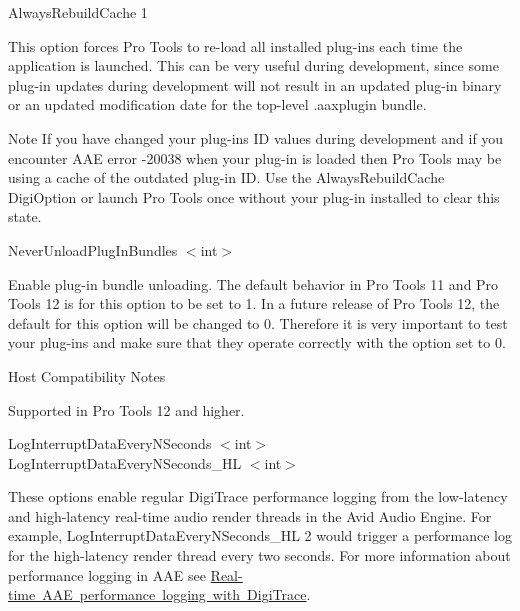 \begin{DoxyItemize}
\item  {\ttfamily Always\+Rebuild\+Cache 1}

This option forces Pro Tools to re-\/load all installed plug-\/ins each time the application is launched. This can be very useful during development, since some plug-\/in updates during development will not result in an updated plug-\/in binary or an updated modification date for the top-\/level .aaxplugin bundle.

\begin{DoxyNote}{Note}
If you have changed your plug-\/in\textquotesingle{}s ID values during development and if you encounter A\+AE error -\/20038 when your plug-\/in is loaded then Pro Tools may be using a cache of the outdated plug-\/in ID. Use the Always\+Rebuild\+Cache Digi\+Option or launch Pro Tools once without your plug-\/in installed to clear this state.
\end{DoxyNote}

\item  {\ttfamily Never\+Unload\+Plug\+In\+Bundles $<$int$>$}

Enable plug-\/in bundle unloading. The default behavior in Pro Tools 11 and Pro Tools 12 is for this option to be set to 1. In a future release of Pro Tools 12, the default for this option will be changed to 0. Therefore it is very important to test your plug-\/ins and make sure that they operate correctly with the option set to 0.

\begin{DoxyRefDesc}{Host Compatibility Notes}
\item[\mbox{\hyperlink{a00786__compatibility_notes000016}{Host Compatibility Notes}}]Supported in Pro Tools 12 and higher.\end{DoxyRefDesc}





\item  {\ttfamily Log\+Interrupt\+Data\+Every\+N\+Seconds $<$int$>$ }~\newline
 {\ttfamily Log\+Interrupt\+Data\+Every\+N\+Seconds\+\_\+\+HL $<$int$>$}

These options enable regular Digi\+Trace performance logging from the low-\/latency and high-\/latency real-\/time audio render threads in the Avid Audio Engine. For example, {\ttfamily Log\+Interrupt\+Data\+Every\+N\+Seconds\+\_\+\+HL 2} would trigger a performance log for the high-\/latency render thread every two seconds. For more information about performance logging in A\+AE see \mbox{\hyperlink{a00834_digitrace__performancelogging}{Real-\/time A\+AE performance logging with Digi\+Trace}}.



\end{DoxyItemize}
